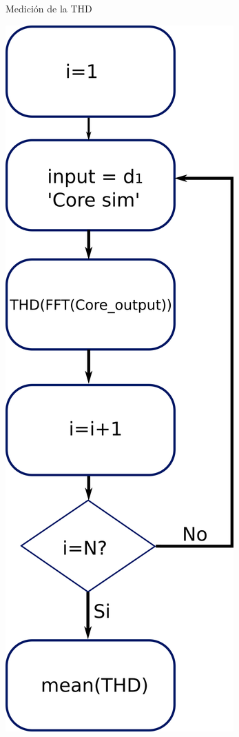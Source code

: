 \begin{frame}{Medición de la THD}
    \begin{center}
      \advance\leftskip-0.2cm
      \includegraphics[scale=0.27]{./figures/thd_sim.png}
    \end{center}
\end{frame}

